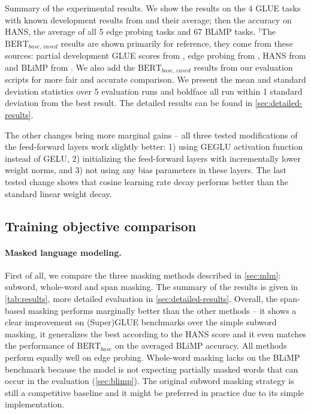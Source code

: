 {\begin{table*}[!th]
    \caption{Summary of the experimental results. We show the results on the 4 GLUE tasks with known development results from  and their average; then the accuracy on HANS, the average of all 5 edge probing tasks and 67 BLiMP tasks. $^\dagger$The $\textrm{BERT}_\textit{base, cased}$ results are shown primarily for reference, they come from these sources: partial development GLUE scores from , edge probing from , HANS from  and BLiMP from . We also add the $\textrm{BERT}_\textit{base, cased}$ results from our evaluation scripts for more fair and accurate comparison. We present the mean and standard deviation statistics over 5 evaluation runs and boldface all run within 1 standard deviation from the best result. The detailed results can be found in \cref{sec:detailed-results}.}
    \label{tab:results}
\end{table*}
}    

    \noindent
    The other changes bring more marginal gains -- all three tested modifications of the feed-forward layers work slightly better: 1) using GEGLU activation function instead of GELU, 2) initializing the feed-forward layers with incrementally lower weight norms, and 3) not using any bias parameters in these layers. The last tested change shows that cosine learning rate decay \citep{https://doi.org/10.48550/arxiv.2112.11446} performs better than the standard linear weight decay.

    \subsection{Training objective comparison}

    \paragraph{Masked language modeling.}
    First of all, we compare the three masking methods described in \cref{sec:mlm}: subword, whole-word and span masking. The summary of the results is given in \cref{tab:results}, more detailed evaluation in \cref{sec:detailed-results}. Overall, the span-based masking performs marginally better than the other methods -- it shows a clear improvement on (Super)GLUE benchmarks over the simple subword masking, it generalizes the best according to the HANS score and it even matches the performance of $\textrm{BERT}_\textit{base}$ on the averaged BLiMP accuracy. All methods perform equally well on edge probing. Whole-word masking lacks on the BLiMP benchmark because the model is not expecting partially masked words that can occur in the evaluation (\cref{sec:blimp}). The original subword masking strategy is still a competitive baseline and it might be preferred in practice due to its simple implementation.  %
    
